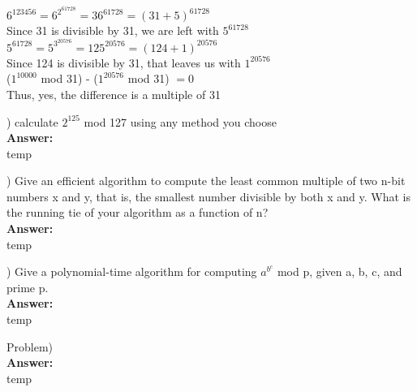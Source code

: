 \documentclass{article}
\begin{document}
\indent $6^{123456} = 6^{2^61728} = 36^{61728} = (31 + 5)^{61728}$ \\
\indent Since 31 is divisible by 31, we are left with $5^{61728}$ \\
\indent $5^{61728} = 5^{3^{20576}} = 125^{20576} = (124 + 1)^{20576}$ \\
\indent Since 124 is divisible by 31, that leaves us with $1^{20576}$ \\

\indent ($1^{10000}$ mod 31) - ($1^{20576}$ mod 31) $= 0$ \\
\indent Thus, yes, the difference is a multiple of 31

\vspace{.3in}
) calculate $2^{125}$ mod 127 using any method you choose \\
\vspace{.1in}
{\bf Answer:} \\
\indent temp

\vspace{.3in}
) Give an efficient algorithm to compute the least common multiple of two 
\indent n-bit numbers x and y, that is, the smallest number divisible by both x and 
\indent y. What is the running tie of your algorithm as a function of n? \\
\vspace{.1in}
{\bf Answer:} \\
\indent temp

\vspace{.3in}
) Give a polynomial-time algorithm for computing $a^{b^c}$ mod p, given a, b, c, 
\indent and prime p. \\
\vspace{.1in}
{\bf Answer:} \\
\indent temp

\vspace{.3in}
\noindent Problem) \\
\vspace{.1in}
{\bf Answer:} \\
\indent temp
\end{document}
